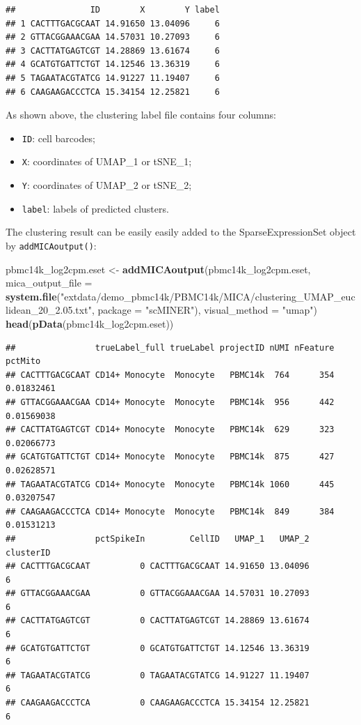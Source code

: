 \documentclass[
  12pt,
]{book}
\newenvironment{Shaded}{\begin{snugshade}}{\end{snugshade}}
\newcommand{\AttributeTok}[1]{\textcolor[rgb]{0.13,0.29,0.53}{#1}}
\newcommand{\FunctionTok}[1]{\textcolor[rgb]{0.13,0.29,0.53}{\textbf{#1}}}
\newcommand{\NormalTok}[1]{#1}
\newcommand{\OtherTok}[1]{\textcolor[rgb]{0.56,0.35,0.01}{#1}}
\newcommand{\StringTok}[1]{\textcolor[rgb]{0.31,0.60,0.02}{#1}}
\providecommand{\tightlist}{%
  \setlength{\itemsep}{0pt}\setlength{\parskip}{0pt}}
\begin{document}
\begin{verbatim}
##               ID        X        Y label
## 1 CACTTTGACGCAAT 14.91650 13.04096     6
## 2 GTTACGGAAACGAA 14.57031 10.27093     6
## 3 CACTTATGAGTCGT 14.28869 13.61674     6
## 4 GCATGTGATTCTGT 14.12546 13.36319     6
## 5 TAGAATACGTATCG 14.91227 11.19407     6
## 6 CAAGAAGACCCTCA 15.34154 12.25821     6
\end{verbatim}

As shown above, the clustering label file contains four columns:

\begin{itemize}
\tightlist
\item
  \texttt{ID}: cell barcodes;
\item
  \texttt{X}: coordinates of UMAP\_1 or tSNE\_1;
\item
  \texttt{Y}: coordinates of UMAP\_2 or tSNE\_2;
\item
  \texttt{label}: labels of predicted clusters.
\end{itemize}

The clustering result can be easily easily added to the SparseExpressionSet object by \texttt{addMICAoutput()}:

\begin{Shaded}
\begin{Highlighting}[]
\NormalTok{pbmc14k\_log2cpm.eset }\OtherTok{\textless{}{-}} \FunctionTok{addMICAoutput}\NormalTok{(pbmc14k\_log2cpm.eset, }\AttributeTok{mica\_output\_file =} \FunctionTok{system.file}\NormalTok{(}\StringTok{"extdata/demo\_pbmc14k/PBMC14k/MICA/clustering\_UMAP\_euclidean\_20\_2.05.txt"}\NormalTok{, }\AttributeTok{package =} \StringTok{"scMINER"}\NormalTok{), }\AttributeTok{visual\_method =} \StringTok{"umap"}\NormalTok{)}
\FunctionTok{head}\NormalTok{(}\FunctionTok{pData}\NormalTok{(pbmc14k\_log2cpm.eset))}
\end{Highlighting}
\end{Shaded}

\begin{verbatim}
##                trueLabel_full trueLabel projectID nUMI nFeature    pctMito
## CACTTTGACGCAAT CD14+ Monocyte  Monocyte   PBMC14k  764      354 0.01832461
## GTTACGGAAACGAA CD14+ Monocyte  Monocyte   PBMC14k  956      442 0.01569038
## CACTTATGAGTCGT CD14+ Monocyte  Monocyte   PBMC14k  629      323 0.02066773
## GCATGTGATTCTGT CD14+ Monocyte  Monocyte   PBMC14k  875      427 0.02628571
## TAGAATACGTATCG CD14+ Monocyte  Monocyte   PBMC14k 1060      445 0.03207547
## CAAGAAGACCCTCA CD14+ Monocyte  Monocyte   PBMC14k  849      384 0.01531213
##                pctSpikeIn         CellID   UMAP_1   UMAP_2 clusterID
## CACTTTGACGCAAT          0 CACTTTGACGCAAT 14.91650 13.04096         6
## GTTACGGAAACGAA          0 GTTACGGAAACGAA 14.57031 10.27093         6
## CACTTATGAGTCGT          0 CACTTATGAGTCGT 14.28869 13.61674         6
## GCATGTGATTCTGT          0 GCATGTGATTCTGT 14.12546 13.36319         6
## TAGAATACGTATCG          0 TAGAATACGTATCG 14.91227 11.19407         6
## CAAGAAGACCCTCA          0 CAAGAAGACCCTCA 15.34154 12.25821         6
\end{verbatim}
\end{document}
